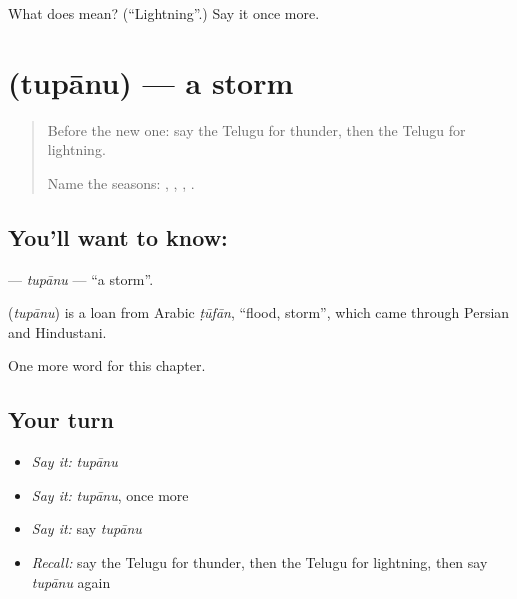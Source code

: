 \begin{tcolorbox}[breakable,colback=teal!4,colframe=teal!35!black,title={Before you move on}]
What does  mean? (\textquotedblleft{}Lightning\textquotedblright{}.) Say it once more.
\end{tcolorbox}
\section[\texorpdfstring{\te{తుపాను} (tupānu)}{తుపాను (tupānu)}]{ (tupānu) — a storm}

\label{lesson:TE-C121-tupanu}



\begin{quote}
Before the new one: say the Telugu for thunder, then the Telugu for lightning.

Name the seasons: \textbf{ }, \textbf{}, \textbf{}, \textbf{}.
\end{quote}

\subsection*{You'll want to know: }
\textbf{} — \emph{tupānu} — \textquotedblleft{}a storm\textquotedblright{}.

\begin{cousinweb}
\textbf{} (\emph{tupānu}) is a loan from Arabic \emph{ṭūfān}, \textquotedblleft{}flood, storm\textquotedblright{}, which came through Persian and Hindustani.
\end{cousinweb}

\begin{grammarlens}[title={What you've built}]
One more word for this chapter.
\end{grammarlens}

\subsection*{Your turn}
\begin{itemize}
\raggedright
  \item \emph{Say it:} \emph{tupānu}
  \item \emph{Say it:} \emph{tupānu}, once more
  \item \emph{Say it:} say \emph{tupānu}
  \item \emph{Recall:} say the Telugu for thunder, then the Telugu for lightning, then say \emph{tupānu} again
\end{itemize}

